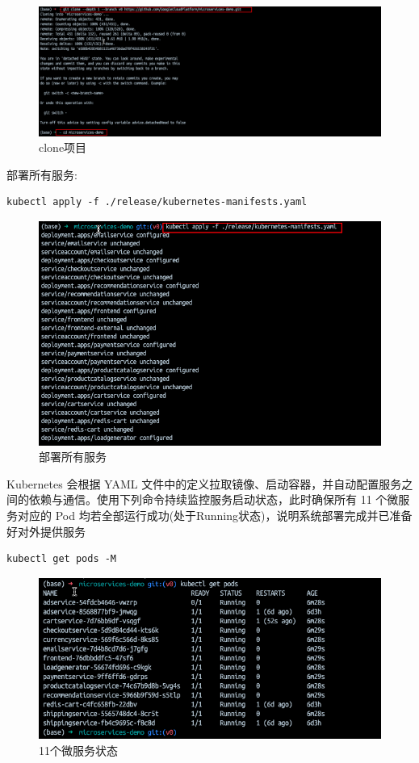 \documentclass[hyperref,a4paper,UTF8]{ctexart}
\begin{document}
\begin{figure}[H]
    \centering
    \includegraphics[width=0.75\linewidth]{部署/clone.png}
    \caption{clone项目}
    \label{fig:enter-label}
\end{figure}

部署所有服务: 
\begin{lstlisting}
kubectl apply -f ./release/kubernetes-manifests.yaml
\end{lstlisting}
\begin{figure}[H]
    \centering
    \includegraphics[width=0.75\linewidth]{apply.png}
    \caption{部署所有服务}
    \label{fig:enter-label}
\end{figure}

Kubernetes 会根据 YAML 文件中的定义拉取镜像、启动容器，并自动配置服务之间的依赖与通信。使用下列命令持续监控服务启动状态，此时确保所有 11 个微服务对应的 Pod 均若全部运行成功(处于Running状态)，说明系统部署完成并已准备好对外提供服务
\begin{lstlisting}
kubectl get pods -M
\end{lstlisting}
\begin{figure}[H]
    \centering
    \includegraphics[width=0.75\linewidth]{部署/running.png}
    \caption{11个微服务状态}
    \label{fig:enter-label}
\end{figure}
\end{document}
